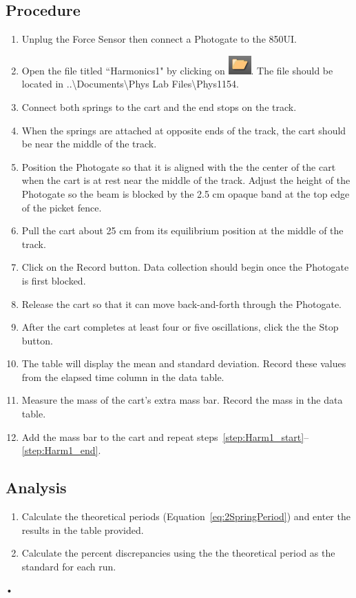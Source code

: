 \documentclass[main.tex]{subfiles}
\begin{document}
\subsection*{Procedure}
\begin{enumerate}
\item
Unplug the Force Sensor then connect a Photogate to the 850UI.
\item
Open the file titled ``Harmonics1" by clicking on \includegraphics{Open_Experiment}. The file should be located in ..\textbackslash Documents\textbackslash Phys Lab Files\textbackslash Phys1154.
\item
Connect both springs to the cart and the end stops on the track.
\item
When the springs are attached at opposite ends of the track, the cart should be near the middle of the track.
\item \label{step:Harm1_start}
Position the Photogate so that it is aligned with the the center of the cart when the cart is at rest near the middle of the track. Adjust the height of the Photogate so the beam is blocked by the 2.5 cm opaque band at the top edge of the picket fence.
\item
Pull the cart about 25 cm from its equilibrium position at the middle of the track.
\item
Click on the Record button. Data collection should begin once the Photogate is first blocked.
\item
Release the cart so that it can move back-and-forth through the Photogate.
\item
After the cart completes at least four or five oscillations, click the the Stop button.
\item
The table will display the mean and standard deviation. Record these values from the elapsed time column in the data table.
\item \label{step:Harm1_end}
Measure the mass of the cart's extra mass bar. Record the mass in the data table.
\item
Add the mass bar to the cart and repeat steps~\ref{step:Harm1_start}--\ref{step:Harm1_end}.
\end{enumerate}

\subsection*{Analysis}
\begin{enumerate}
\item
Calculate the theoretical periods (Equation~\eqref{eq:2SpringPeriod}) and enter the results in the table provided. 
\item
Calculate the percent discrepancies using the the theoretical period as the standard for each run.
\end{enumerate}•
\end{document}
